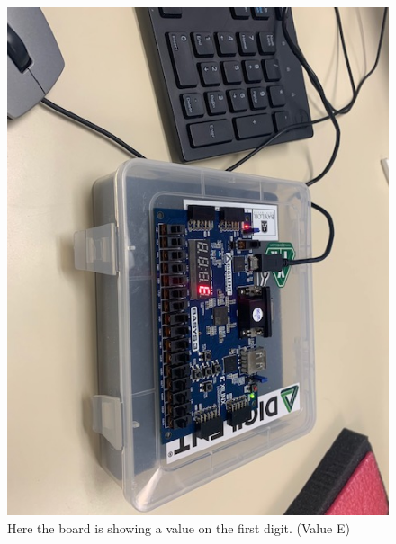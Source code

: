 \documentclass[11pt]{article}
\begin{document}
\begin{figure}[ht]\centering
	\includegraphics[width=.95\textwidth, trim=0cm 0cm 0cm 0cm,clip]{E}
	\caption{Here the board is showing a value on the first digit. (Value E)}
	\label{fig:Board-firstdigit}	
\end{figure}
\end{document}
